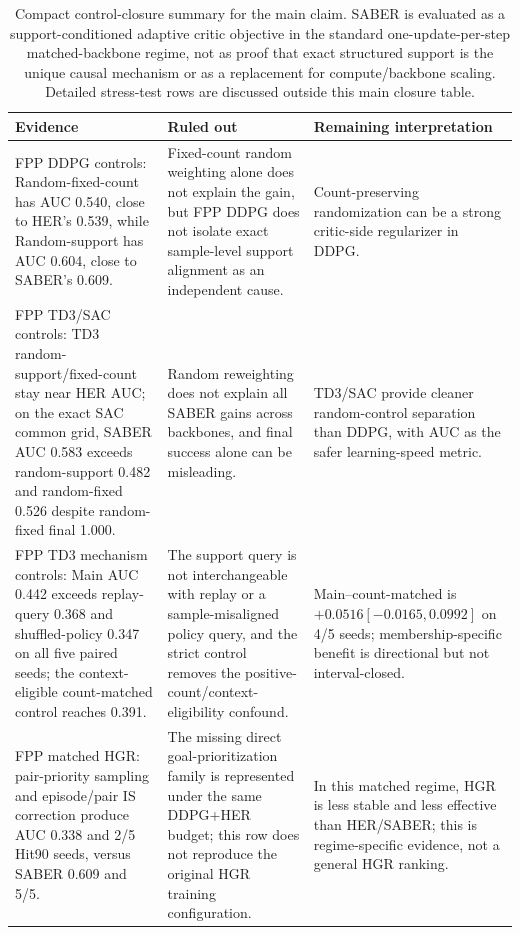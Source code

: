 \documentclass[letterpaper]{article}
\begin{document}
\begin{table}[t]
\centering
\scriptsize
\caption{Compact control-closure summary for the main claim. SABER is evaluated as a support-conditioned adaptive critic objective in the standard one-update-per-step matched-backbone regime, not as proof that exact structured support is the unique causal mechanism or as a replacement for compute/backbone scaling. Detailed stress-test rows are discussed outside this main closure table.}
\label{tab:control-closure}
\setlength{\tabcolsep}{4pt}
\begin{tabular}{p{}p{}p{}}
\toprule
Evidence & Ruled out & Remaining interpretation \\
\midrule
FPP DDPG controls: Random-fixed-count has AUC 0.540, close to HER's 0.539, while Random-support has AUC 0.604, close to SABER's 0.609. &
Fixed-count random weighting alone does not explain the gain, but FPP DDPG does not isolate exact sample-level support alignment as an independent cause. &
Count-preserving randomization can be a strong critic-side regularizer in DDPG. \\
\addlinespace
FPP TD3/SAC controls: TD3 random-support/fixed-count stay near HER AUC; on the exact SAC common grid, SABER AUC 0.583 exceeds random-support 0.482 and random-fixed 0.526 despite random-fixed final 1.000. &
Random reweighting does not explain all SABER gains across backbones, and final success alone can be misleading. &
TD3/SAC provide cleaner random-control separation than DDPG, with AUC as the safer learning-speed metric. \\
\addlinespace
FPP TD3 mechanism controls: Main AUC 0.442 exceeds replay-query 0.368 and shuffled-policy 0.347 on all five paired seeds; the context-eligible count-matched control reaches 0.391. &
The support query is not interchangeable with replay or a sample-misaligned policy query, and the strict control removes the positive-count/context-eligibility confound. &
Main--count-matched is \(+0.0516[-0.0165,0.0992]\) on 4/5 seeds; membership-specific benefit is directional but not interval-closed. \\
\addlinespace
FPP matched HGR: pair-priority sampling and episode/pair IS correction produce AUC 0.338 and 2/5 Hit90 seeds, versus SABER 0.609 and 5/5. &
The missing direct goal-prioritization family is represented under the same DDPG+HER budget; this row does not reproduce the original HGR training configuration. &
In this matched regime, HGR is less stable and less effective than HER/SABER; this is regime-specific evidence, not a general HGR ranking. \\

\end{tabular}
\end{table}
\end{document}
